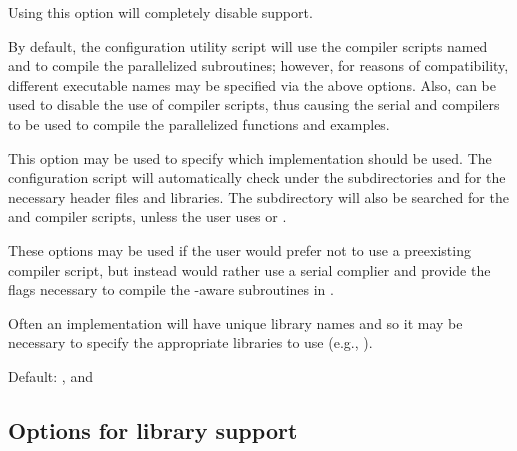 \begin{config}
  
\item {}

  Using this option will completely disable {\mpi} support.

\item {}
\item {}

  By default, the configuration utility script will use the {\mpi} compiler
  scripts named  and  to compile the parallelized
  {\sundials} subroutines; however, for reasons of compatibility, different
  executable names may be specified via the above options. Also, 
  can be used to disable the use of {\mpi} compiler scripts, thus causing
  the serial {\C} and {\F} compilers to be used to compile the parallelized
  {\sundials} functions and examples.

\item {}

  This option may be used to specify which {\mpi} implementation should be used.
  The {\sundials} configuration script will automatically check under the
  subdirectories  and  for the necessary
  header files and libraries. The subdirectory  will also be
  searched for the {\C} and {\F} {\mpi} compiler scripts, unless the user uses
   or .

\item {}
\item {}
\item {}

  These options may be used if the user would prefer not to use a preexisting
  {\mpi} compiler script, but instead would rather use a serial complier and
  provide the flags necessary to compile the {\mpi}-aware subroutines in
  {\sundials}.

  Often an {\mpi} implementation will have unique library names and so it may
  be necessary to specify the appropriate libraries to use (e.g.,
  ).

  Default: ,  and 

\end{config}


\subsection*{Options for library support}

